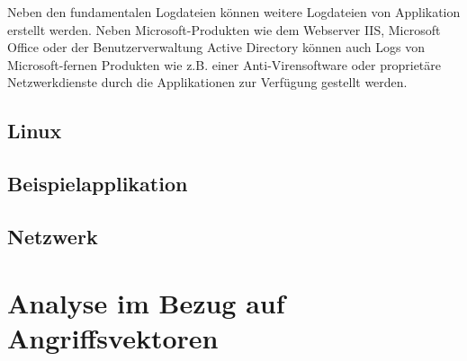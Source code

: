 Neben den fundamentalen Logdateien können weitere Logdateien von Applikation erstellt werden. Neben Microsoft-Produkten wie dem Webserver IIS, Microsoft Office oder der Benutzerverwaltung Active Directory können auch Logs von Microsoft-fernen Produkten wie z.B. einer Anti-Virensoftware oder proprietäre Netzwerkdienste durch die Applikationen zur Verfügung gestellt werden.

\subsection{Linux}
\subsection{Beispielapplikation}
\subsection{Netzwerk}
\section{Analyse im Bezug auf Angriffsvektoren}